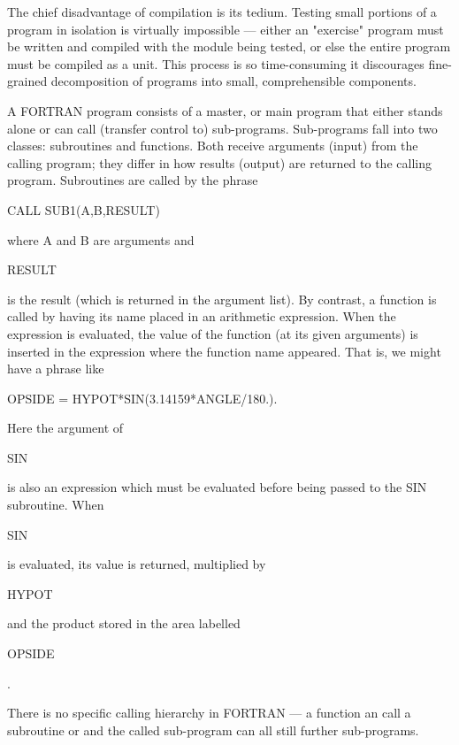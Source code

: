 The chief disadvantage of compilation is its tedium. Testing small portions of a program in isolation is virtually impossible — either an "exercise" program must be written and compiled with the module being tested, or else the entire program must be compiled as a unit. This process is so time-consuming it discourages fine-grained decomposition of programs into small, comprehensible components.
 

A FORTRAN program consists of a master, or main program that either stands alone or can call (transfer control to) sub-programs. Sub-programs fall into two classes: subroutines and functions. Both receive arguments (input) from the calling program; they differ in how results (output) are returned to the calling program. Subroutines are called by the phrase

\begin{code}
CALL SUB1(A,B,RESULT)
\end{code}

where A and B are arguments and \begin{code} RESULT \end{code} is the result (which is returned in the argument list). By contrast, a function is called by having its name placed in an arithmetic expression. When the expression is evaluated, the value of the function (at its given arguments) is inserted in the expression where the function name appeared. That is, we might have a phrase like

\begin{code}
OPSIDE = HYPOT*SIN(3.14159*ANGLE/180.).
\end{code}

Here the argument of \begin{code}SIN\end{code} is also an expression which must be evaluated before being passed to the SIN subroutine. When \begin{code}SIN\end{code} is evaluated, its value is returned, multiplied by \begin{code}HYPOT\end{code} and the product stored in the area labelled \begin{code}OPSIDE\end{code}.

There is no specific calling hierarchy in FORTRAN — a function an call a subroutine or  and the called sub-program can all still further sub-programs.


